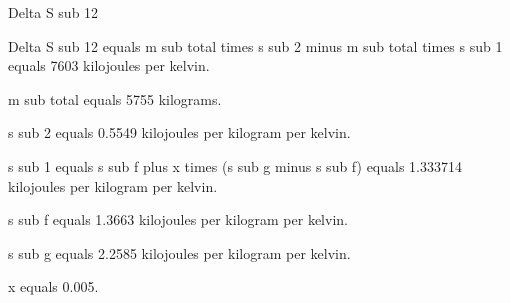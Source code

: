 Delta S sub 12  

Delta S sub 12 equals m sub total times s sub 2 minus m sub total times s sub 1 equals 7603 kilojoules per kelvin.  

m sub total equals 5755 kilograms.  

s sub 2 equals 0.5549 kilojoules per kilogram per kelvin.  

s sub 1 equals s sub f plus x times (s sub g minus s sub f) equals 1.333714 kilojoules per kilogram per kelvin.  

s sub f equals 1.3663 kilojoules per kilogram per kelvin.  

s sub g equals 2.2585 kilojoules per kilogram per kelvin.  

x equals 0.005.